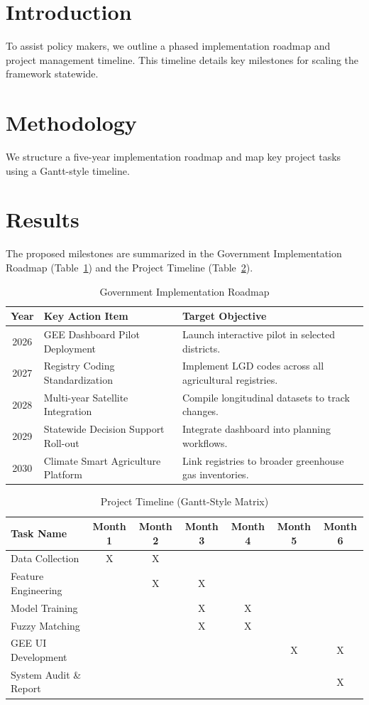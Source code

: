 \documentclass[12pt,a4paper]{report}
\begin{document}
\section{Introduction}
To assist policy makers, we outline a phased implementation roadmap and project management timeline. This timeline details key milestones for scaling the framework statewide.

\section{Methodology}
We structure a five-year implementation roadmap and map key project tasks using a Gantt-style timeline.

\section{Results}
The proposed milestones are summarized in the Government Implementation Roadmap (Table~\ref{tab:gov_roadmap}) and the Project Timeline (Table~\ref{tab:project_timeline}).

\begin{table}[H]
\centering
\caption{Government Implementation Roadmap}
\label{tab:gov_roadmap}
\begin{tabular}{cll}
\toprule
\textbf{Year} & \textbf{Key Action Item} & \textbf{Target Objective} \\
\midrule
2026 & GEE Dashboard Pilot Deployment & Launch interactive pilot in selected districts. \\
2027 & Registry Coding Standardization & Implement LGD codes across all agricultural registries. \\
2028 & Multi-year Satellite Integration & Compile longitudinal datasets to track changes. \\
2029 & Statewide Decision Support Roll-out & Integrate dashboard into planning workflows. \\
2030 & Climate Smart Agriculture Platform & Link registries to broader greenhouse gas inventories. \\
\bottomrule
\end{tabular}
\end{table}

\begin{table}[H]
\centering
\caption{Project Timeline (Gantt-Style Matrix)}
\label{tab:project_timeline}
\begin{tabular}{lcccccc}
\toprule
\textbf{Task Name} & \textbf{Month 1} & \textbf{Month 2} & \textbf{Month 3} & \textbf{Month 4} & \textbf{Month 5} & \textbf{Month 6} \\
\midrule
Data Collection & X & X & & & & \\
Feature Engineering & & X & X & & & \\
Model Training & & & X & X & & \\
Fuzzy Matching & & & X & X & & \\
GEE UI Development & & & & & X & X \\
System Audit \& Report & & & & & & X \\
\bottomrule
\end{tabular}
\end{table}
\end{document}
